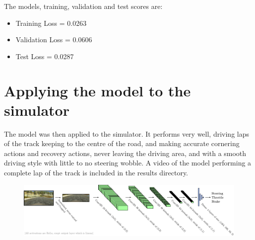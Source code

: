 \documentclass[letterpaper,12pt]{article}
\begin{document}
\noindent The models, training, validation and test scores are:
\begin{itemize}
\item Training Loss =  0.0263
\item Validation Loss = 0.0606
\item Test Loss = 0.0287
\end{itemize}


\section{Applying the model to the simulator}
The model was then applied to the simulator. It performs very well, driving laps of the track keeping to the centre of the road, and making accurate cornering actions and recovery actions, never leaving the driving area, and with a smooth driving style with little to no steering wobble. A video of the model performing a complete lap of the track is included in the results directory. 
\FloatBarrier
\begin{figure}
\centering
\includegraphics[scale=1.2]{results/model.pdf}
\end{figure}
\FloatBarrier
\end{document}
